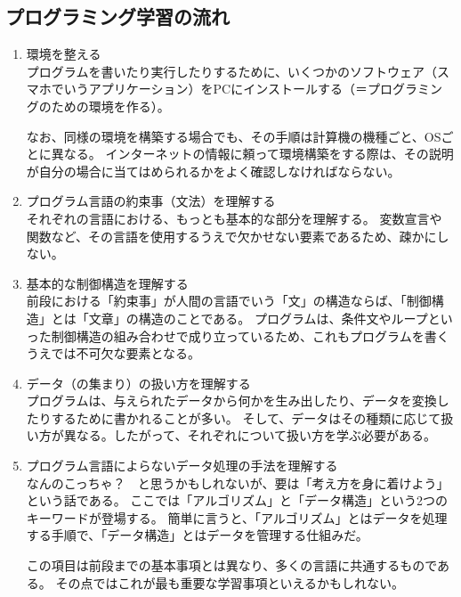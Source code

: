 \documentclass[lualatex,ja=standard,12pt,a4j]{bxjsbook}
\begin{document}
			\subsection{プログラミング学習の流れ}
			\begin{enumerate}
				\item 環境を整える\\
				プログラムを書いたり実行したりするために、いくつかのソフトウェア（スマホでいうアプリケーション）をPCにインストールする（＝プログラミングのための環境を作る）。
                
				なお、同様の環境を構築する場合でも、その手順は計算機の機種ごと、OSごとに異なる。
                インターネットの情報に頼って環境構築をする際は、その説明が自分の場合に当てはめられるかをよく確認しなければならない。
				
				\item プログラム言語の約束事（文法）を理解する\\
                それぞれの言語における、もっとも基本的な部分を理解する。
                変数宣言や関数など、その言語を使用するうえで欠かせない要素であるため、疎かにしない。
			
				\item 基本的な制御構造を理解する\\
				前段における「約束事」が人間の言語でいう「文」の構造ならば、「制御構造」とは「文章」の構造のことである。
                プログラムは、条件文やループといった制御構造の組み合わせで成り立っているため、これもプログラムを書くうえでは不可欠な要素となる。
                
				\item データ（の集まり）の扱い方を理解する\\
				プログラムは、与えられたデータから何かを生み出したり、データを変換したりするために書かれることが多い。
                そして、データはその種類に応じて扱い方が異なる。したがって、それぞれについて扱い方を学ぶ必要がある。
				
				\item プログラム言語によらないデータ処理の手法を理解する\\
				なんのこっちゃ？　と思うかもしれないが、要は「考え方を身に着けよう」という話である。
                ここでは「アルゴリズム」と「データ構造」という2つのキーワードが登場する。
                簡単に言うと、「アルゴリズム」とはデータを処理する手順で、「データ構造」とはデータを管理する仕組みだ。
                
                この項目は前段までの基本事項とは異なり、多くの言語に共通するものである。
                その点ではこれが最も重要な学習事項といえるかもしれない。
				

\end{enumerate}
\end{document}
